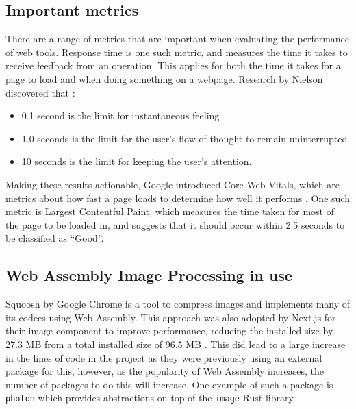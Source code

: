 \documentclass[12pt,a4paper]{article}
\begin{document}
\subsection{Important metrics}

There are a range of metrics that are important when evaluating the performance of web tools. Response time is one such metric, and measures the time it takes to receive feedback from an operation. This applies for both the time it takes for a page to load and when doing something on a webpage. Research by Nielson discovered that \cite{nielsen1994usability}:
\begin{itemize}
    \item 0.1 second is the limit for instantaneous feeling
    \item 1.0 seconds is the limit for the user's flow of thought to remain uninterrupted
    \item 10 seconds is the limit for keeping the user's attention.
\end{itemize}

Making these results actionable, Google introduced Core Web Vitals, which are metrics about how fast a page loads to determine how well it performs \cite{webvitals}. One such metric is Largest Contentful Paint, which measures the time taken for most of the page to be loaded in, and suggests that it should occur within 2.5 seconds to be classified as “Good”.




\subsection{Web Assembly Image Processing in use}

Squoosh by Google Chrome is a tool to compress images and implements many of its codecs using Web Assembly. This approach was also adopted by Next.js for their image component to improve performance, reducing the installed size by 27.3 MB from a total installed size of 96.5 MB \cite{nextjs}. This did lead to a large increase in the lines of code in the project as they were previously using an external package for this, however, as the popularity of Web Assembly increases, the number of packages to do this will increase. One example of such a package is \texttt{photon} which provides abstractions on top of the \texttt{image} Rust library \cite{photon}.

\end{document}
